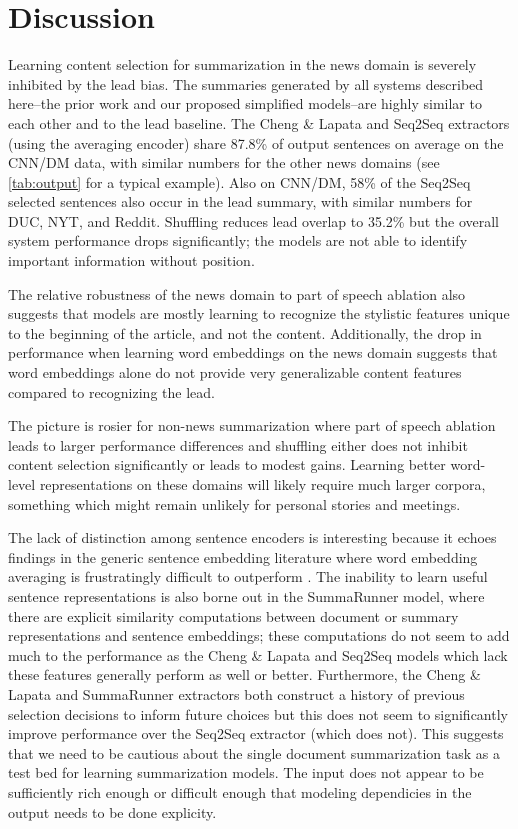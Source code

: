 

\section{Discussion}

Learning content selection for summarization in the news domain is severely
inhibited by the lead bias.  The summaries generated by all systems described
here--the prior work and our proposed simplified models--are highly similar to
each other and to the lead baseline. The Cheng \& Lapata and Seq2Seq extractors
(using the averaging encoder) share 87.8\% of output sentences on average on
the CNN/DM data, with similar numbers for the other news domains (see
\autoref{tab:output} for a typical example).  Also on CNN/DM, 58\% of the
Seq2Seq selected sentences also occur in the lead summary, with similar numbers
for DUC, NYT, and Reddit. Shuffling reduces lead overlap to 35.2\% but the
overall system performance drops significantly; the models are not able to
identify important information without position.
    
The relative robustness of the news domain to part of speech ablation also
suggests that models are mostly learning to recognize the stylistic features
unique to the beginning of the article, and not the content.  Additionally, the
drop in performance when learning word embeddings on the news domain suggests
that word embeddings alone do not provide very generalizable content features
compared to recognizing the lead.

The picture is rosier for non-news summarization where part of speech ablation
leads to larger performance differences and shuffling either does not inhibit
content selection significantly or leads to modest gains. Learning better
word-level representations on these domains will likely require much larger
corpora, something which might remain unlikely for personal stories and
meetings.

The lack of distinction among sentence encoders is interesting because it
echoes findings in the generic sentence embedding literature where word
embedding averaging is frustratingly difficult to outperform
\citep{iyyer2015,wieting2015,arora2017,wieting2017}.  The inability to learn
useful sentence representations is also borne out in the SummaRunner model,
where there are explicit similarity computations between document or summary
representations and sentence embeddings; these computations do not seem to add
much to the performance as the Cheng \& Lapata and Seq2Seq models which lack
these features generally perform as well or better.  Furthermore, the Cheng \&
Lapata and SummaRunner extractors both construct a history of previous
selection decisions to inform future choices but this does not seem to
significantly improve performance over the Seq2Seq extractor (which does not).
This suggests that we need to be cautious about the single document
summarization task as a test bed for learning summarization models.  The input
does not appear to be sufficiently rich enough or difficult enough that
modeling dependicies in the output needs to be done explicity. 

